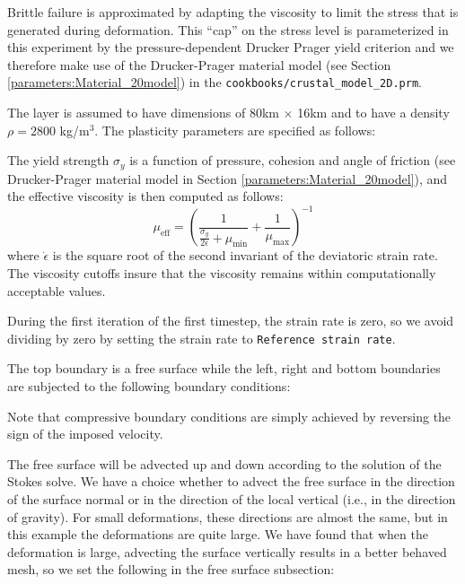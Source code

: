 \documentclass{article}
\begin{document}
Brittle failure is approximated by adapting the viscosity to limit the stress 
that is generated during deformation. 
This ``cap'' on the stress level is parameterized in this experiment by the pressure-dependent 
Drucker Prager yield criterion  and we therefore make use of the Drucker-Prager 
material model (see Section \ref{parameters:Material_20model}) in the 
{\tt cookbooks/crustal\_model\_2D.prm}.

The layer is assumed to have dimensions of 80km $\times$ 16km and to have a density  $\rho=2800$ kg/m$^3$. 
The plasticity parameters are specified as follows:



The yield strength $\sigma_y$ is a function of pressure, cohesion and angle of friction 
(see Drucker-Prager material model in Section \ref{parameters:Material_20model}),
and the effective viscosity is then computed as follows:
\[
\mu_{\text{eff}} = \left( \frac{1}{ \frac{\sigma_y}{2 \dot{\epsilon}}+
\mu_{\text{min}}} + \frac{1}{\mu_{\text{max}}}  \right)^{-1}
\]
where $\dot{\epsilon}$ is the square root of the second invariant of the deviatoric strain rate.
The viscosity cutoffs insure that the viscosity remains within computationally acceptable values.

During the first iteration of the first timestep, the strain rate is zero, so
we avoid dividing by zero by setting the strain rate to {\tt Reference strain rate}.


The top boundary is a free surface while the left, right and bottom boundaries are subjected 
to the following boundary conditions:



Note that compressive boundary conditions are simply achieved by reversing  
the sign of the imposed velocity.

The free surface will be advected up and down according to the solution of the Stokes solve.
We have a choice whether to advect the free surface in the direction of the surface normal
or in the direction of the local vertical (i.e., in the direction of gravity).
For small deformations, these directions are almost the same, but in this example the deformations 
are quite large. We have found that when the deformation is large, advecting the surface vertically 
results in a better behaved mesh, so we set the following in the free surface subsection:
\end{document}
